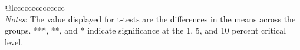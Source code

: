 \documentclass{article}
\begin{document}
\begin{table}[!htbp]
\begin{adjustbox}{max width=\textwidth}
\begin{tabular}{@{\extracolsep{5pt}}lcccccccccccccc}
\hline \hline \\[-1.8ex]
{\textit{Notes}:  The value displayed for t-tests are the differences in the means across the groups. ***, **, and * indicate significance at the 1, 5, and 10 percent critical level. }
\end{tabular}
\end{adjustbox}
\end{table}
\end{document}
